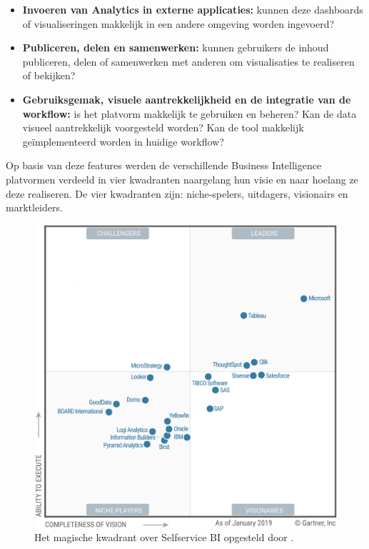 \begin{itemize}
	\item \textbf{Invoeren van Analytics in externe applicaties:} kunnen deze dashboards of visualiseringen makkelijk in een andere omgeving worden ingevoerd?
	\item \textbf{Publiceren, delen en samenwerken: } kunnen gebruikers de inhoud publiceren, delen of samenwerken met anderen om visualisaties te realiseren of bekijken?
	\item \textbf{Gebruiksgemak, visuele aantrekkelijkheid en de integratie van de workflow:} is het platvorm makkelijk te gebruiken en beheren? Kan de data visueel aantrekkelijk voorgesteld worden? Kan de tool makkelijk geïmplementeerd worden in huidige workflow?
\end{itemize} 

Op basis van deze features werden de verschillende Business Intelligence platvormen verdeeld in vier kwadranten naargelang hun visie en naar hoelang ze deze realiseren. De vier kwadranten zijn: niche-spelers, uitdagers, visionairs en marktleiders.

\begin{figure}[h]
	\centering
	\includegraphics[scale=0.7]{../images/gartner.png}
	\caption{Het magische kwadrant over Selfservice BI opgesteld door \textcite{Gartner2019}.}
	\label{fig:dvmode}
\end{figure}

